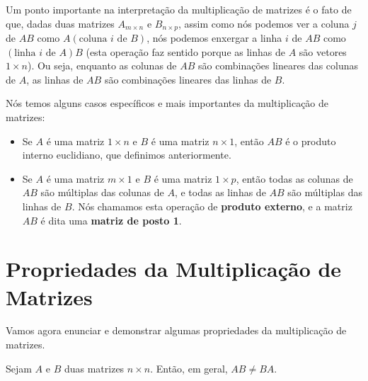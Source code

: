 Um ponto importante na interpretação da multiplicação de matrizes é o fato de que, dadas duas matrizes $A_{m\times n}$ e $B_{n\times p}$, assim como nós podemos ver a coluna $j$ de $AB$ como $A(\text{coluna $i$ de $B$})$, nós podemos enxergar a linha $i$ de $AB$ como $(\text{linha $i$ de $A$})B$ (esta operação faz sentido porque as linhas de $A$ são vetores $1\times n$). Ou seja, enquanto as colunas de $AB$ são combinações lineares das colunas de $A$, as linhas de $AB$ são combinações lineares das linhas de $B$.

Nós temos alguns casos específicos e mais importantes da multiplicação de matrizes:

\begin{itemize}
	\item Se $A$ é uma matriz $1\times n$ e $B$ é uma matriz $n\times 1$, então $AB$ é o produto interno euclidiano, que definimos anteriormente.
	
	\item Se $A$ é uma matriz $m\times 1$ e $B$ é uma matriz $1\times p$, então todas as colunas de $AB$ são múltiplas das colunas de $A$, e todas as linhas de $AB$ são múltiplas das linhas de $B$. Nós chamamos esta operação de \textbf{produto externo}, e a matriz $AB$ é dita uma \textbf{matriz de posto 1}.
\end{itemize}

\section{Propriedades da Multiplicação de Matrizes}

Vamos agora enunciar e demonstrar algumas propriedades da multiplicação de matrizes.

\begin{Proposition}
	Sejam $A$ e $B$ duas matrizes $n\times n$. Então, em geral, $AB\neq BA$.
\end{Proposition}

